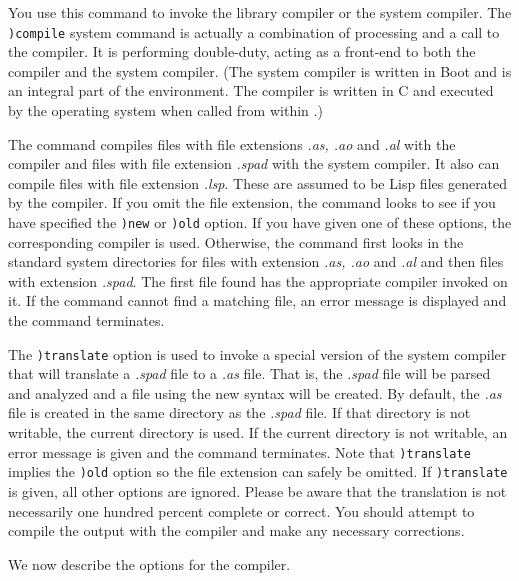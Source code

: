 \par{}

You use this command to invoke the \aldor{} library compiler or
the \Language{} system compiler.
The {\tt )compile} system command is actually a combination of
\Language{} processing and a call to the \aldor{} compiler.
It is performing double-duty, acting as a front-end to
both the \aldor{} compiler and the \Language{} system
compiler.
(The \Language{} system compiler is written in Boot and is
an integral part of the \Language{} environment.
The \aldor{} compiler is written in C and executed by the operating system
when called from within \Language{}.)

The command compiles files with file extensions {\it .as, .ao}
and {\it .al} with the
\aldor{} compiler and files with file extension {\it .spad} with the
\Language{} system compiler.
It also can compile files with file extension {\it .lsp}. These
are assumed to be Lisp files generated by the \aldor{}
compiler.
If you omit the file extension, the command looks to see if you
have specified the {\tt )new} or {\tt )old} option.
If you have given one of these options, the corresponding compiler
is used.
Otherwise, the command first looks in the standard system
directories for files with extension {\it .as, .ao} and {\it
.al} and then files with extension {\it .spad}.
The first file found has the appropriate compiler invoked on it.
If the command cannot find a matching file, an error message is
displayed and the command terminates.

The {\tt )translate} option is used to invoke a special version
of the \Language{} system compiler that will translate a {\it .spad} file
to a {\it .as} file. That is, the {\it .spad} file will be parsed and
analyzed and a file using the new syntax will be created. By default,
the {\it .as} file is created in the same directory as the
{\it .spad} file. If that directory is not writable, the current
directory is used. If the current directory is not writable, an
error message is given and the command terminates.
Note that {\tt )translate} implies the {\tt )old} option so the
file extension can safely be omitted. If {\tt )translate} is
given, all other options are ignored.
Please be aware that the translation is not necessarily one
hundred percent complete or correct.
You should attempt to compile the output with the \aldor{} compiler
and make any necessary corrections.

We now describe the options for the \aldor{} compiler.


